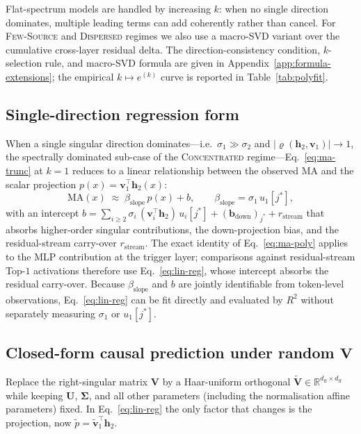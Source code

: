 \documentclass{article}
\newcommand{\ma}{\mathrm{MA}}
\newcommand{\ffd}{d_{\text{ff}}}
\begin{document}
Flat-spectrum models are handled by increasing $k$: when no single
direction dominates, multiple leading terms can add coherently rather than
cancel. For \textsc{Few-Source} and \textsc{Dispersed} regimes we also use a
macro-SVD variant over the cumulative cross-layer residual delta. The
direction-consistency condition, $k$-selection rule, and macro-SVD formula
are given in Appendix~\ref{app:formula-extensions}; the empirical
$k \mapsto e^{(k)}$ curve is reported in Table~\ref{tab:polyfit}.

\subsection{Single-direction regression form}
\label{sec:method-reg}

When a single singular direction dominates---i.e.\ $\sigma_1 \gg \sigma_2$
and $|\varrho(\mathbf{h}_2, \mathbf{v}_1)| \to 1$, the spectrally dominated
sub-case of the \textsc{Concentrated} regime---Eq.~\eqref{eq:ma-trunc} at
$k{=}1$ reduces to a linear relationship between the observed MA and the
scalar projection $p(x) = \mathbf{v}_1^{\top}\mathbf{h}_2(x)$:
\begin{equation}
  \label{eq:lin-reg}
  \ma(x) \;\approx\; \beta_{\text{slope}}\,p(x) + b, \qquad \beta_{\text{slope}} = \sigma_1\,u_1[j^{*}],
\end{equation}
with an intercept
$b = \sum_{i \geq 2} \sigma_i\,(\mathbf{v}_i^{\top}\mathbf{h}_2)\,u_i[j^{*}] + (\mathbf{b}_{\text{down}})_{j^{*}} + r_{\text{stream}}$
that absorbs higher-order singular contributions, the down-projection bias,
and the residual-stream carry-over $r_{\text{stream}}$. The exact identity
of Eq.~\eqref{eq:ma-poly} applies to the MLP contribution at the trigger
layer; comparisons against residual-stream Top-$1$ activations therefore
use Eq.~\eqref{eq:lin-reg}, whose intercept absorbs the residual
carry-over. Because $\beta_{\text{slope}}$ and $b$ are jointly identifiable
from token-level observations, Eq.~\eqref{eq:lin-reg} can be fit directly
and evaluated by $R^2$ without separately measuring $\sigma_1$ or
$u_1[j^{*}]$.

\subsection{Closed-form causal prediction under random $\mathbf{V}$}
\label{sec:method-vcf}

Replace the right-singular matrix $\mathbf{V}$ by a Haar-uniform orthogonal
$\tilde{\mathbf{V}} \in \mathbb{R}^{\ffd \times \ffd}$ while keeping
$\mathbf{U}$, $\boldsymbol{\Sigma}$, and all other parameters (including
the normalisation affine parameters) fixed. In Eq.~\eqref{eq:lin-reg} the
only factor that changes is the projection, now
$\tilde{p} = \tilde{\mathbf{v}}_1^{\top}\mathbf{h}_2$.
\end{document}
